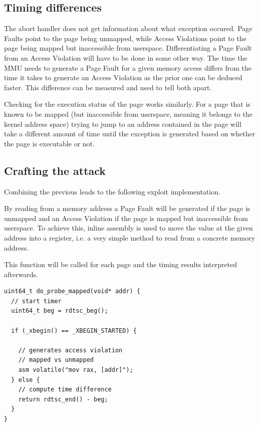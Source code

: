 \subsection{Timing differences}

The abort handler does not get information about what exception occured.
Page Faults point to the page being unmapped, while Access Violations point to the page being mapped but inaccessible from userspace.
Differentiating a Page Fault from an Access Violation will have to be done in some other way.
The time the MMU needs to generate a Page Fault for a given memory access differs from the time it takes to generate an Access Violation as the prior one can be deduced faster.
This difference can be measured and used to tell both apart.

Checking for the execution status of the page works similarly.
For a page that is known to be mapped (but inaccessible from userspace, meaning it belongs to the kernel address space) trying to jump to an address contained in the page will take a different amount of time until the exception is generated based on whether the page is executable or not.

\subsection{Crafting the attack}

Combining the previous leads to the following exploit implementation.

By reading from a memory address a Page Fault will be generated if the page is unmapped and an Access Violation if the page is mapped but inaccessible from userspace.
To achieve this, inline assembly is used to move the value at the given address into a register, i.e. a very simple method to read from a concrete memory address.

This function will be called for each page and the timing results interpreted afterwards.

\begin{lstlisting}
uint64_t do_probe_mapped(void* addr) {
  // start timer
  uint64_t beg = rdtsc_beg();

  if (_xbegin() == _XBEGIN_STARTED) {

    // generates access violation
    // mapped vs unmapped
    asm volatile("mov rax, [addr]");
  } else {
    // compute time difference
    return rdtsc_end() - beg;
  }
}
\end{lstlisting}

